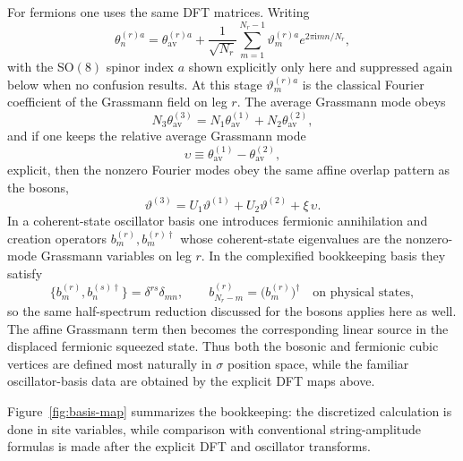 \documentclass[11pt]{article}
\numberwithin{equation}{section}
\newcommand{\ii}{\mathrm{i}}
\begin{document}
For fermions one uses the same DFT matrices. Writing
\begin{equation}
\label{eq:s10-025}
\theta_n^{(r)a}=\theta_{\mathrm{av}}^{(r)a}+\frac{1}{\sqrt{N_r}}\sum_{m=1}^{N_r-1}\vartheta_m^{(r)a}e^{2\pi \ii mn/N_r},
\end{equation}
with the SO$(8)$ spinor index $a$ shown explicitly only here and suppressed again below when no confusion results. At this stage $\vartheta_m^{(r)a}$ is the classical Fourier coefficient of the Grassmann field on leg $r$. The average Grassmann mode obeys
\begin{equation}
\label{eq:s10-026}
N_3\theta_{\mathrm{av}}^{(3)}=N_1\theta_{\mathrm{av}}^{(1)}+N_2\theta_{\mathrm{av}}^{(2)},
\end{equation}
and if one keeps the relative average Grassmann mode
\begin{equation}
\label{eq:s10-027}
\upsilon\equiv \theta_{\mathrm{av}}^{(1)}-\theta_{\mathrm{av}}^{(2)},
\end{equation}
explicit, then the nonzero Fourier modes obey the same affine overlap pattern as the bosons,
\begin{equation}
\label{eq:s10-028}
\vartheta^{(3)} = U_1 \vartheta^{(1)} + U_2 \vartheta^{(2)} + \xi\,\upsilon.
\end{equation}
In a coherent-state oscillator basis one introduces fermionic annihilation and creation operators $b_m^{(r)}, b_m^{(r)\dagger}$ whose coherent-state eigenvalues are the nonzero-mode Grassmann variables on leg $r$. In the complexified bookkeeping basis they satisfy
\begin{equation}
\label{eq:s10-029}
\{b_m^{(r)},b_n^{(s)\dagger}\}=\delta^{rs}\delta_{mn},
\qquad
b_{N_r-m}^{(r)}=\bigl(b_m^{(r)}\bigr)^\dagger
\quad
\text{on physical states},
\end{equation}
so the same half-spectrum reduction discussed for the bosons applies here as well. The affine Grassmann term then becomes the corresponding linear source in the displaced fermionic squeezed state. Thus both the bosonic and fermionic cubic vertices are defined most naturally in $\sigma$ position space, while the familiar oscillator-basis data are obtained by the explicit DFT maps above.

Figure~\ref{fig:basis-map} summarizes the bookkeeping: the discretized calculation is done in site variables, while comparison with conventional string-amplitude formulas is made after the explicit DFT and oscillator transforms.
\end{document}
